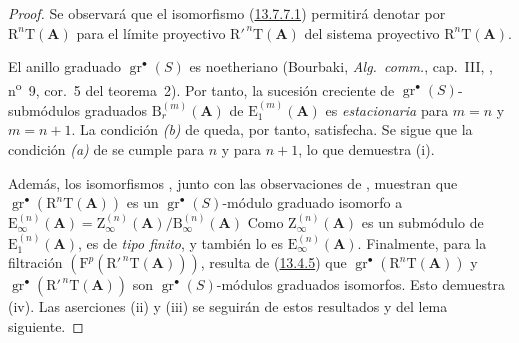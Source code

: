 \documentclass[10pt,oneside,openany]{book}
\theoremstyle{egaenv}\newtheorem*{env}{---}
\theoremstyle{egastatement}
\theoremstyle{egadescription}
\begin{document}
\begin{proof}
Se observará que el isomorfismo (\hyperref[0.13.7.7.1-fr]{13.7.7.1}) permitirá denotar por $\mathrm R^n\mathrm T(\mathbf A)$ para el límite proyectivo
$\mathrm R'^{\,n}\mathrm T(\mathbf A)$ del sistema proyectivo
$\mathrm R^n\mathrm T(\mathbf A)$.

El anillo graduado $\operatorname{gr}^\bullet(S)$ es noetheriano
(Bourbaki, \emph{Alg.\ comm.}, cap.~III, ,
n\textsuperscript{o}~9, cor.~5 del teorema~2).
Por tanto, la sucesión creciente de
$\operatorname{gr}^\bullet(S)$-submódulos graduados
$\mathrm B_r^{(m)}(\mathbf A)$ de
$\mathrm E_1^{(m)}(\mathbf A)$ es \emph{estacionaria} para $m=n$ y
$m=n+1$.
La condición \emph{(b)} de  queda, por tanto, satisfecha.
Se sigue que la condición \emph{(a)} de  se cumple para
$n$ y para $n+1$, lo que demuestra {\rm(i)}.

Además, los isomorfismos , junto con las
observaciones de , muestran que
$\operatorname{gr}^\bullet(\mathrm R^n\mathrm T(\mathbf A))$ es un
$\operatorname{gr}^\bullet(S)$-módulo graduado isomorfo a
$\mathrm E_\infty^{(n)}(\mathbf A)=
\mathrm Z_\infty^{(n)}(\mathbf A)/\mathrm B_\infty^{(n)}(\mathbf A)$
Como $\mathrm Z_\infty^{(n)}(\mathbf A)$ es un submódulo de
$\mathrm E_1^{(n)}(\mathbf A)$, es de \emph{tipo finito}, y también lo es
$\mathrm E_\infty^{(n)}(\mathbf A)$.
Finalmente, para la filtración
$(\mathrm F^p(\mathrm R'^{\,n}\mathrm T(\mathbf A)))$, resulta de (\hyperref[0.13.4.5-fr]{13.4.5}) que $\operatorname{gr}^\bullet(\mathrm R^n\mathrm T(\mathbf A))$ y $\operatorname{gr}^\bullet(\mathrm R'^{\,n}\mathrm T(\mathbf A))$ son $\operatorname{gr}^\bullet(S)$-módulos graduados isomorfos.
Esto demuestra {\rm(iv)}.
Las aserciones {\rm(ii)} y {\rm(iii)} se seguirán de estos resultados
y del lema siguiente.
\end{proof}
\end{document}
